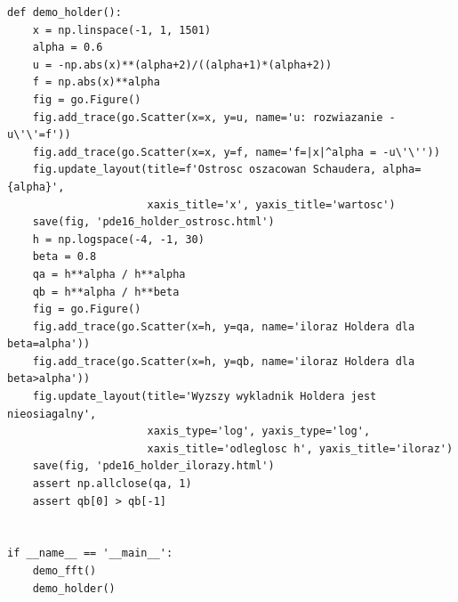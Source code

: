 \begin{lstlisting}[style=pythonpde,caption={Rachunek spektralny dla Hessianu i wykresy ilustrujące oszacowania Schaudera (Plotly)},label={code:pde16-plotly}]
def demo_holder():
    x = np.linspace(-1, 1, 1501)
    alpha = 0.6
    u = -np.abs(x)**(alpha+2)/((alpha+1)*(alpha+2))
    f = np.abs(x)**alpha
    fig = go.Figure()
    fig.add_trace(go.Scatter(x=x, y=u, name='u: rozwiazanie -u\'\'=f'))
    fig.add_trace(go.Scatter(x=x, y=f, name='f=|x|^alpha = -u\'\''))
    fig.update_layout(title=f'Ostrosc oszacowan Schaudera, alpha={alpha}',
                      xaxis_title='x', yaxis_title='wartosc')
    save(fig, 'pde16_holder_ostrosc.html')
    h = np.logspace(-4, -1, 30)
    beta = 0.8
    qa = h**alpha / h**alpha
    qb = h**alpha / h**beta
    fig = go.Figure()
    fig.add_trace(go.Scatter(x=h, y=qa, name='iloraz Holdera dla beta=alpha'))
    fig.add_trace(go.Scatter(x=h, y=qb, name='iloraz Holdera dla beta>alpha'))
    fig.update_layout(title='Wyzszy wykladnik Holdera jest nieosiagalny',
                      xaxis_type='log', yaxis_type='log',
                      xaxis_title='odleglosc h', yaxis_title='iloraz')
    save(fig, 'pde16_holder_ilorazy.html')
    assert np.allclose(qa, 1)
    assert qb[0] > qb[-1]


if __name__ == '__main__':
    demo_fft()
    demo_holder()
\end{lstlisting}

